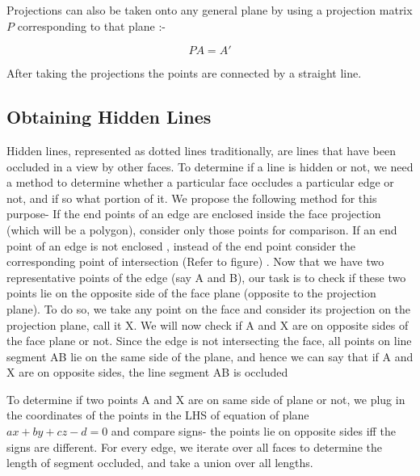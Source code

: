\documentclass[12pt,a4paper]{article}
\begin{document}
Projections can also be taken onto any general plane by using a projection matrix \boldmath$P$ corresponding to that plane :- 

\begin{equation}
P  A = A'
\end{equation}

After taking the projections the points are connected by a straight line. 


\subsection{Obtaining Hidden Lines}

Hidden lines, represented as dotted lines traditionally, are lines that have been occluded in a view by other faces. To determine if a line is hidden or not, we need a method to determine whether a particular face occludes a particular edge or not, and if so what portion of it. We propose the following method for this purpose-
If the end points of an edge are enclosed inside the face projection (which will be a polygon), consider only those points for comparison.
If an end point of an edge is not enclosed , instead of the end point consider the corresponding  point of intersection (Refer to figure) .
Now that we have two representative points of the edge (say A and B), our task is to check if these two points lie on the opposite side of the face plane (opposite to the projection plane). To do so, we take any point on the face and consider its projection on the projection plane, call it X. We will now check if A and X are on opposite sides of the face plane or not. Since the edge is not intersecting the  face, all points on line segment AB lie on the same side of the plane, and hence we can say that if A and X are on opposite sides, the line segment AB is occluded 
 \newline


%
To determine if two points A and X are on same side of plane or not, we plug in the coordinates of the points in the LHS of equation of plane \(ax + by + cz - d = 0\) and compare signs- the points lie on opposite sides iff the signs are different. 
For every edge, we iterate over all faces to determine the length of segment occluded, and take a union over all lengths. 
\\ \\ \\ \\ \\
\end{document}
